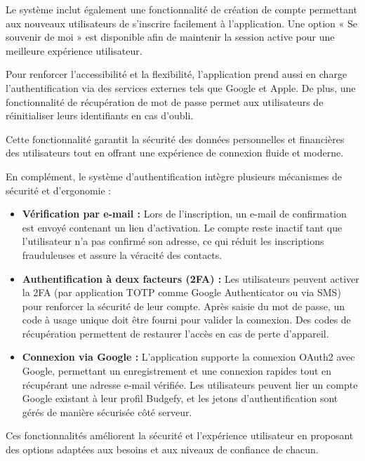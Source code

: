 \documentclass{rapportPFA}
\begin{document}
Le système inclut également une fonctionnalité de création de compte permettant aux nouveaux utilisateurs de s’inscrire facilement à l’application. Une option « Se souvenir de moi » est disponible afin de maintenir la session active pour une meilleure expérience utilisateur.

Pour renforcer l’accessibilité et la flexibilité, l’application prend aussi en charge l’authentification via des services externes tels que Google et Apple. De plus, une fonctionnalité de récupération de mot de passe permet aux utilisateurs de réinitialiser leurs identifiants en cas d’oubli.

Cette fonctionnalité garantit la sécurité des données personnelles et financières des utilisateurs tout en offrant une expérience de connexion fluide et moderne.
\par
En complément, le système d'authentification intègre plusieurs mécanismes de sécurité et d'ergonomie :
\begin{itemize}
    \item \textbf{Vérification par e-mail :} Lors de l'inscription, un e-mail de confirmation est envoyé contenant un lien d'activation. Le compte reste inactif tant que l'utilisateur n'a pas confirmé son adresse, ce qui réduit les inscriptions frauduleuses et assure la véracité des contacts.
    \item \textbf{Authentification à deux facteurs (2FA) :} Les utilisateurs peuvent activer la 2FA (par application TOTP comme Google Authenticator ou via SMS) pour renforcer la sécurité de leur compte. Après saisie du mot de passe, un code à usage unique doit être fourni pour valider la connexion. Des codes de récupération permettent de restaurer l'accès en cas de perte d'appareil.
    \item \textbf{Connexion via Google :} L'application supporte la connexion OAuth2 avec Google, permettant un enregistrement et une connexion rapides tout en récupérant une adresse e-mail vérifiée. Les utilisateurs peuvent lier un compte Google existant à leur profil Budgefy, et les jetons d'authentification sont gérés de manière sécurisée côté serveur.
\end{itemize}

Ces fonctionnalités améliorent la sécurité et l'expérience utilisateur en proposant des options adaptées aux besoins et aux niveaux de confiance de chacun.
\end{document}

